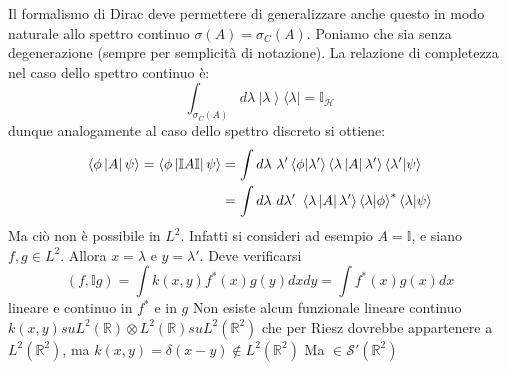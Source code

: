 \documentclass[../../FisicaTeorica.tex]{subfiles}
\begin{document}
\begin{enumerate}
	Il formalismo di Dirac deve permettere di generalizzare anche questo in modo naturale allo spettro continuo $\sigma \left(A\right)= \sigma_C\left(A\right)$. Poniamo che sia senza degenerazione (sempre per semplicità di notazione).
	La relazione di completezza nel caso dello spettro continuo è:
	\[
	\int_{\sigma_C\left(A\right)}{d\lambda\ \left|\lambda\right\rangle\langle\lambda|}=\mathbb{I}_\mathcal{H}
	\]
	dunque analogamente al caso dello spettro discreto si ottiene:
	\begin{align}
	\left\langle\phi\left|A\right|\psi\right\rangle=\left\langle\phi\left|\mathbb{I}A\mathbb{I}\right|\psi\right\rangle&=\int d\lambda \  \lambda'\left\langle\phi\middle|\lambda'\right\rangle\left\langle\lambda\left|A\right|\lambda'\right\rangle\left\langle\lambda'\middle|\psi\right\rangle \notag \\
	& =\int d\lambda \ d\lambda' \ \left\langle\lambda\left|A\right|\lambda'\right\rangle\left\langle\lambda|\phi\right\rangle^\ast\left\langle\lambda\middle|\psi\right\rangle \notag
	\end{align}
	Ma ciò non è possibile in $L^2$. Infatti si consideri ad esempio $A=\mathbb I$, e siano $f,g\in L^2$. Allora $x = \lambda$ e $y = \lambda'$. Deve verificarsi
	\[
	\left(f,\mathbb{I}g\right)=\int k\left(x,y\right)f^\ast\left(x\right)g\left(y\right)dx dy
	=\int f^\ast\left(x\right) g\left(x\right)dx
	\] lineare e continuo in $f^\ast$ e in $g$
	Non esiste alcun funzionale lineare continuo
	$ k\left(x,y\right) su L^2\left(\mathbb{R}\right)\otimes L^2\left(\mathbb{R}\right) su L^2(\mathbb{R}^2)$ che per Riesz dovrebbe appartenere a $L^2\left(\mathbb{R}^2\right)$, ma $k\left(x,y\right)=\delta \left(x-y\right)\notin L^2\left(\mathbb{R}^2\right)$
	Ma $\in \mathcal{S}'\left(\mathbb{R}^2\right)$
\end{enumerate}
\end{document}
